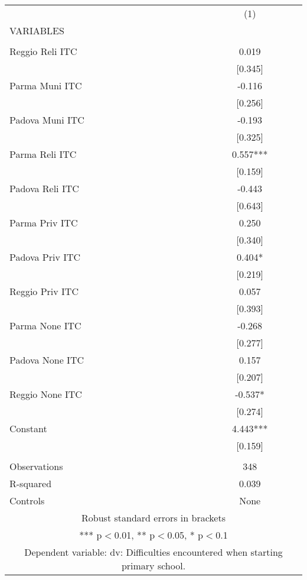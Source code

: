 \begin{tabular}{lc} \hline
 & (1) \\
VARIABLES &  \\ \hline
 &  \\
Reggio Reli ITC & 0.019 \\
 & [0.345] \\
Parma Muni ITC & -0.116 \\
 & [0.256] \\
Padova Muni ITC & -0.193 \\
 & [0.325] \\
Parma Reli ITC & 0.557*** \\
 & [0.159] \\
Padova Reli ITC & -0.443 \\
 & [0.643] \\
Parma Priv ITC & 0.250 \\
 & [0.340] \\
Padova Priv ITC & 0.404* \\
 & [0.219] \\
Reggio Priv ITC & 0.057 \\
 & [0.393] \\
Parma None ITC & -0.268 \\
 & [0.277] \\
Padova None ITC & 0.157 \\
 & [0.207] \\
Reggio None ITC & -0.537* \\
 & [0.274] \\
Constant & 4.443*** \\
 & [0.159] \\
 &  \\
Observations & 348 \\
R-squared & 0.039 \\
 Controls & None \\ \hline
\multicolumn{2}{c}{ Robust standard errors in brackets} \\
\multicolumn{2}{c}{ *** p$<$0.01, ** p$<$0.05, * p$<$0.1} \\
\multicolumn{2}{c}{ Dependent variable: dv: Difficulties encountered when starting primary school.} \\
\end{tabular}
